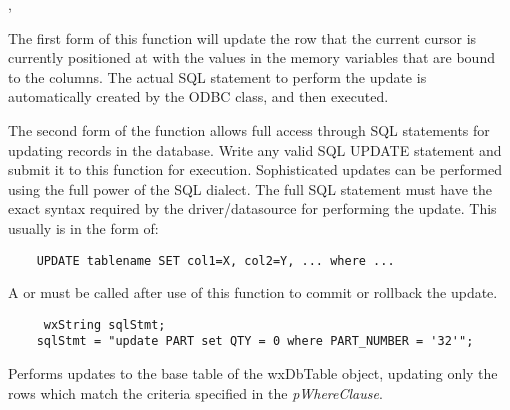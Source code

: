 
,

\label{wxdbtableupdate}



The first form of this function will update the row that the current cursor
is currently positioned at with the values in the memory variables that
are bound to the columns.  The actual SQL statement to perform the update
is automatically created by the ODBC class, and then executed.

The second form of the function allows full access through SQL statements for
updating records in the database.  Write any valid SQL UPDATE statement and
submit it to this function for execution.  Sophisticated updates can be
performed using the full power of the SQL dialect. The full SQL statement
must have  the exact syntax required by the driver/datasource for performing
the update.  This usually is in the form of:

\begin{verbatim}
    UPDATE tablename SET col1=X, col2=Y, ... where ...
\end{verbatim}




A  or
 must be called after use of
this function to commit or rollback the update.


\begin{verbatim}
	 wxString sqlStmt;
    sqlStmt = "update PART set QTY = 0 where PART_NUMBER = '32'";
\end{verbatim}

\label{wxdbtableupdatewhere}


Performs updates to the base table of the wxDbTable object, updating only the
rows which match the criteria specified in the {\it pWhereClause}.

